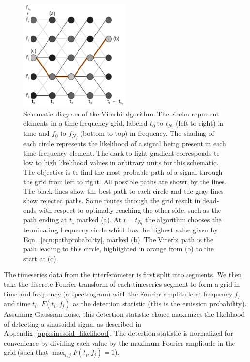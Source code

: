 \documentclass[paper-main.tex]{subfiles}
\begin{document}
\begin{figure}
\includegraphics[width=0.5\textwidth]{figures/viterbiDiagramGrey.pdf}
\caption{\label{fig:viterbi}
Schematic diagram of the Viterbi algorithm. 
The circles represent elements in a time-frequency grid, labeled $t_0$ to $t_{N_t}$ (left to right) in time and $f_0$ to $f_{N_f}$ (bottom to top) in frequency. 
The shading of each circle represents the likelihood of a signal being present in each time-frequency element.
The dark to light gradient corresponds to low to high likelihood values in arbitrary units for this schematic. 
The objective is to find the most probable path of a signal through the grid from left to right.
All possible paths are shown by the lines. 
The black lines show the best path to each circle and the gray lines show rejected paths. 
Some routes through the grid result in dead-ends with respect to optimally reaching the other side, such as the path ending at $t_1$ marked (a).
At $t=t_{N_t}$ the algorithm chooses the terminating frequency circle which has the highest value given by Eqn.~\ref{eqn:pathprobability}, marked (b). 
The Viterbi path is the path leading to this circle, highlighted in orange from (b) to the start at (c). 
}
\end{figure}













The timeseries data from the interferometer is first split into segments. 
We then take the discrete Fourier transform of each timeseries segment to form a grid in time and frequency (a spectrogram) with the Fourier amplitude at frequency $f_j$ and time $t_i$, $F(t_i,f_j)$ as the detection statistic (this is the emission probability).
Assuming Gaussian noise, this detection statistic choice maximizes the likelihood of detecting a sinusoidal signal as described in Appendix~\ref{app:sinusoid_likelihood}.
The detection statistic is normalized for convenience by dividing each value by the maximum Fourier amplitude in the grid (such that $\max_{i,j} F(t_i,f_j) = 1$).
\end{document}
